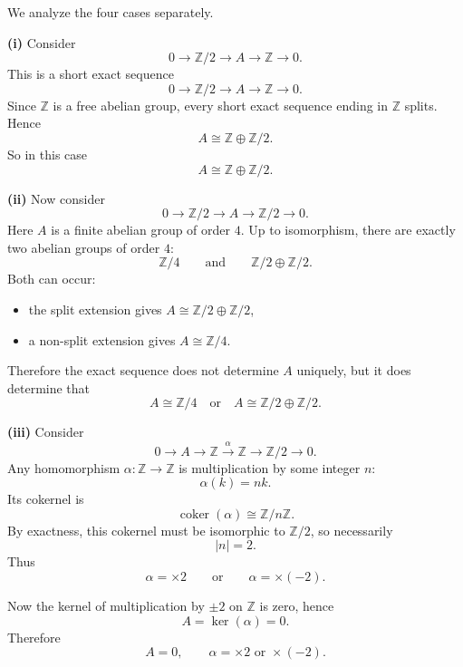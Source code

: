 \begin{solution}

We analyze the four cases separately.

\par

\textbf{(i)} Consider
\[
0 \longrightarrow \mathbb Z/2 \longrightarrow A \longrightarrow \mathbb Z \longrightarrow 0.
\]
This is a short exact sequence
\[
0 \longrightarrow \mathbb Z/2 \longrightarrow A \longrightarrow \mathbb Z \longrightarrow 0.
\]
Since \(\mathbb Z\) is a free abelian group, every short exact sequence ending in \(\mathbb Z\) splits. Hence
\[
A \cong \mathbb Z \oplus \mathbb Z/2.
\]
So in this case
\[
\boxed{A \cong \mathbb Z \oplus \mathbb Z/2.}
\]

\par

\textbf{(ii)} Now consider
\[
0 \longrightarrow \mathbb Z/2 \longrightarrow A \longrightarrow \mathbb Z/2 \longrightarrow 0.
\]
Here \(A\) is a finite abelian group of order \(4\). Up to isomorphism, there are exactly two abelian groups of order \(4\):
\[
\mathbb Z/4 \qquad\text{and}\qquad \mathbb Z/2 \oplus \mathbb Z/2.
\]
Both can occur:

\begin{itemize}
	\item the split extension gives \(A \cong \mathbb Z/2 \oplus \mathbb Z/2\),
	\item a non-split extension gives \(A \cong \mathbb Z/4\).
\end{itemize}

Therefore the exact sequence does not determine \(A\) uniquely, but it does determine that
\[
\boxed{A \cong \mathbb Z/4 \quad\text{or}\quad A \cong \mathbb Z/2 \oplus \mathbb Z/2.}
\]

\par

\textbf{(iii)} Consider
\[
0 \longrightarrow A \longrightarrow \mathbb Z \xrightarrow{\alpha} \mathbb Z \longrightarrow \mathbb Z/2 \longrightarrow 0.
\]
Any homomorphism \(\alpha:\mathbb Z \to \mathbb Z\) is multiplication by some integer \(n\):
\[
\alpha(k)=nk.
\]
Its cokernel is
\[
\operatorname{coker}(\alpha)\cong \mathbb Z/n\mathbb Z.
\]
By exactness, this cokernel must be isomorphic to \(\mathbb Z/2\), so necessarily
\[
|n|=2.
\]
Thus
\[
\alpha=\times 2 \qquad\text{or}\qquad \alpha=\times (-2).
\]

Now the kernel of multiplication by \(\pm 2\) on \(\mathbb Z\) is zero, hence
\[
A=\ker(\alpha)=0.
\]
Therefore
\[
\boxed{A=0,\qquad \alpha=\times 2 \text{ or } \times(-2).}
\]


\end{solution}
